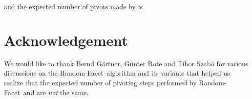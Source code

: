\documentclass[twoside,11pt]{article}
\newcommand{\RandomFacet}{\mbox{\sc Random-}\allowbreak\mbox{\sc Facet}}
\begin{document}
and
the expected number of pivots made by  is





\section*{Acknowledgement}

We would like to thank Bernd G{\"a}rtner, G\"{u}nter Rote and Tibor Szab\'{o} for various discussions on the \RandomFacet\ algorithm and its variants that helped us realize that the expected number of pivoting steps performed by \RandomFacet\ and  are \emph{not} the same.



\end{document}
